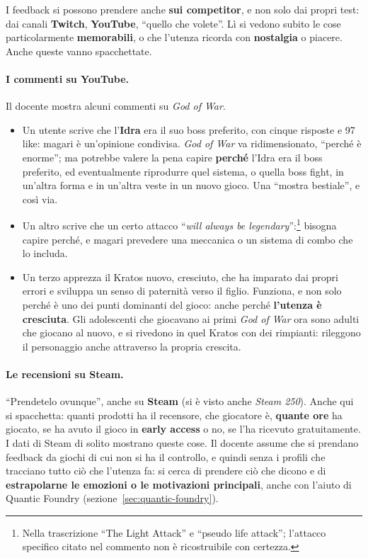 

I feedback si possono prendere anche \textbf{sui competitor}, e non solo dai
propri test: dai canali \textbf{Twitch}, \textbf{YouTube}, ``quello che
volete''. Lì si vedono subito le cose particolarmente \textbf{memorabili}, o
che l'utenza ricorda con \textbf{nostalgia} o piacere. Anche queste vanno
spacchettate.

\paragraph{I commenti su YouTube.} Il docente mostra alcuni commenti su
\emph{God of War}.
\begin{itemize}
  \item Un utente scrive che l'\textbf{Idra} era il suo boss preferito, con
        cinque risposte e 97 like: magari è un'opinione condivisa.
        \emph{God of War} va ridimensionato, ``perché è enorme''; ma
        potrebbe valere la pena capire \textbf{perché} l'Idra era il boss
        preferito, ed eventualmente riprodurre quel sistema, o quella boss
        fight, in un'altra forma e in un'altra veste in un nuovo gioco. Una
        ``mostra bestiale'', e così via.
  \item Un altro scrive che un certo attacco ``\emph{will always be
        legendary}'':\footnote{Nella trascrizione ``The Light Attack'' e
        ``pseudo life attack''; l'attacco specifico citato nel commento non
        è ricostruibile con certezza.} bisogna capire perché, e magari
        prevedere una meccanica o un sistema di combo che lo includa.
  \item Un terzo apprezza il Kratos nuovo, cresciuto, che ha imparato dai
        propri errori e sviluppa un senso di paternità verso il figlio.
        Funziona, e non solo perché è uno dei punti dominanti del gioco:
        anche perché \textbf{l'utenza è cresciuta}. Gli adolescenti che
        giocavano ai primi \emph{God of War} ora sono adulti che giocano al
        nuovo, e si rivedono in quel Kratos con dei rimpianti: rileggono il
        personaggio anche attraverso la propria crescita.
\end{itemize}

\paragraph{Le recensioni su Steam.} ``Prendetelo ovunque'', anche su
\textbf{Steam} (si è visto anche \emph{Steam 250}). Anche qui si spacchetta:
quanti prodotti ha il recensore, che giocatore è, \textbf{quante ore} ha
giocato, se ha avuto il gioco in \textbf{early access} o no, se l'ha ricevuto
gratuitamente. I dati di Steam di solito mostrano queste cose. Il docente
assume che si prendano feedback da giochi di cui non si ha il controllo, e
quindi senza i profili che tracciano tutto ciò che l'utenza fa: si cerca di
prendere ciò che dicono e di \textbf{estrapolarne le emozioni o le
motivazioni principali}, anche con l'aiuto di Quantic Foundry
(sezione~\ref{sec:quantic-foundry}).

